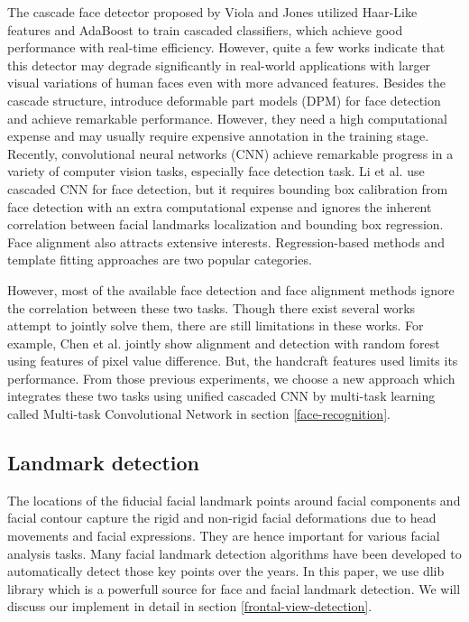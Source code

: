 \documentclass[journal, twocolumn]{IEEEtran}
\begin{document}
The cascade face detector proposed by Viola and Jones \cite{ref:detect-1} utilized Haar-Like features and AdaBoost to train cascaded classifiers, which achieve good performance with real-time efficiency. However, quite a few works \cite{ref:detect-2, ref:detect-3, ref:detect-4} indicate that this detector may degrade significantly in real-world applications with larger visual variations of human faces even with more advanced features. Besides the cascade structure, \cite{ref:detect-5, ref:detect-6, ref:detect-7} introduce deformable part models (DPM) for face detection and achieve remarkable performance. However, they need a high computational expense and may usually require expensive annotation in the training stage. Recently, convolutional neural networks (CNN) achieve remarkable progress in a variety of computer vision tasks, especially face detection task. Li et al. \cite{ref:detect-8} use cascaded CNN for face detection, but it requires bounding box calibration from face detection with an extra computational expense and ignores the inherent correlation between facial landmarks localization and bounding box regression. Face alignment also attracts extensive interests. Regression-based methods \cite{ref:detect-9, ref:detect-10, ref:detect-11} and template fitting approaches \cite{ref:detect-7}\cite{ref:detect-12}\cite{ref:detect-13} are two popular categories.

However, most of the available face detection and face alignment methods ignore the correlation between these two tasks. Though there exist several works attempt to jointly solve them, there are still limitations in these works. For example, Chen et al. \cite{ref:detect-14} jointly show alignment and detection with random forest using features of pixel value difference. But, the handcraft features used limits its performance. From those previous experiments, we choose a new approach which integrates these two tasks using unified cascaded CNN by multi-task learning called Multi-task Convolutional Network in section \ref{face-recognition}.


\subsection{Landmark detection}
The locations of the fiducial facial landmark points around facial components and facial contour capture  the  rigid  and  non-rigid  facial  deformations  due to  head  movements  and  facial  expressions.  They  are hence important for various facial analysis tasks. Many facial landmark detection algorithms have been developed to automatically detect those key points over the years. In this paper, we use dlib library which is a powerfull source for face and facial landmark detection. We will discuss our implement in detail in section \ref{frontal-view-detection}.
\end{document}
